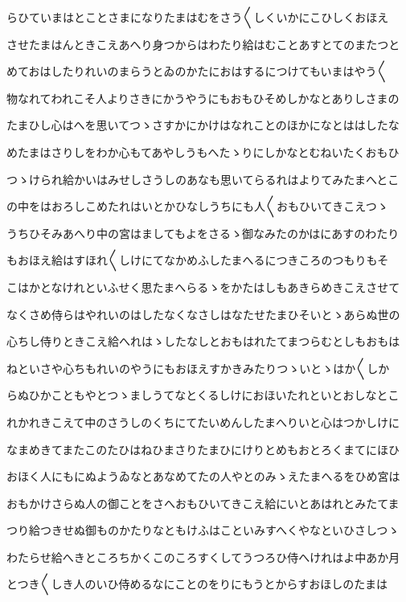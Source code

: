 \documentclass[a4paper,11pt,landscape]{ltjtarticle}
\begin{document}
らひていまはとことさまになりたまはむをさう〱しくいかにこひしくおほえ
\par\medskip
させたまはんときこえあへり身つからはわたり給はむことあすとてのまたつと
\par\medskip
めておはしたりれいのまらうとゐのかたにおはするにつけてもいまはやう〱
\par\medskip
物なれてわれこそ人よりさきにかうやうにもおもひそめしかなとありしさまの
\par\medskip
たまひし心はへを思いてつゝさすかにかけはなれことのほかになとははしたな
\par\medskip
めたまはさりしをわか心もてあやしうもへたゝりにしかなとむねいたくおもひ
\par\medskip
つゝけられ給かいはみせしさうしのあなも思いてらるれはよりてみたまへとこ
\par\medskip
の中をはおろしこめたれはいとかひなしうちにも人〱おもひいてきこえつゝ
\par\medskip
うちひそみあへり中の宮はましてもよをさるゝ御なみたのかはにあすのわたり
\par\medskip
もおほえ給はすほれ〱しけにてなかめふしたまへるにつきころのつもりもそ
\par\medskip
こはかとなけれといふせく思たまへらるゝをかたはしもあきらめきこえさせて
\par\medskip
なくさめ侍らはやれいのはしたなくなさしはなたせたまひそいとゝあらぬ世の
\par\medskip
心ちし侍りときこえ給へれはゝしたなしとおもはれたてまつらむとしもおもは
\par\medskip
ねといさや心ちもれいのやうにもおほえすかきみたりつゝいとゝはか〱しか
\par\medskip
らぬひかこともやとつゝましうてなとくるしけにおほいたれといとおしなとこ
\par\medskip
れかれきこえて中のさうしのくちにてたいめんしたまへりいと心はつかしけに
\par\medskip
なまめきてまたこのたひはねひまさりたまひにけりとめもおとろくまてにほひ
\par\medskip
おほく人にもにぬようゐなとあなめてたの人やとのみゝえたまへるをひめ宮は
\par\medskip
おもかけさらぬ人の御ことをさへおもひいてきこえ給にいとあはれとみたてま
\par\medskip
つり給つきせぬ御ものかたりなともけふはこといみすへくやなといひさしつゝ
\par\medskip
わたらせ給へきところちかくこのころすくしてうつろひ侍へけれはよ中あか月
\par\medskip
とつき〱しき人のいひ侍めるなにことのをりにもうとからすおほしのたまは
\end{document}
